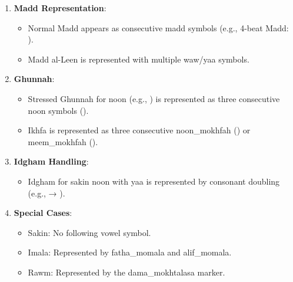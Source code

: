 \begin{enumerate}
	\item \textbf{Madd Representation}:
	      \begin{itemize}
		      \item Normal Madd appears as consecutive madd symbols (e.g., 4-beat Madd: ).
		      \item Madd al-Leen is represented with multiple waw/yaa symbols.
	      \end{itemize}

	\item \textbf{Ghunnah}:
	      \begin{itemize}
		      \item Stressed Ghunnah for noon (e.g., ) is represented as three consecutive noon symbols ().
		      \item Ikhfa is represented as three consecutive noon\_mokhfah () or meem\_mokhfah ().
	      \end{itemize}

	\item \textbf{Idgham Handling}:
	      \begin{itemize}
		      \item Idgham for sakin noon with yaa is represented by consonant doubling (e.g.,  → ).
	      \end{itemize}

	\item \textbf{Special Cases}:
	      \begin{itemize}
		      \item Sakin: No following vowel symbol.
		      \item Imala: Represented by fatha\_momala and alif\_momala.
		      \item Rawm: Represented by the dama\_mokhtalasa marker.
	      \end{itemize}
\end{enumerate}


